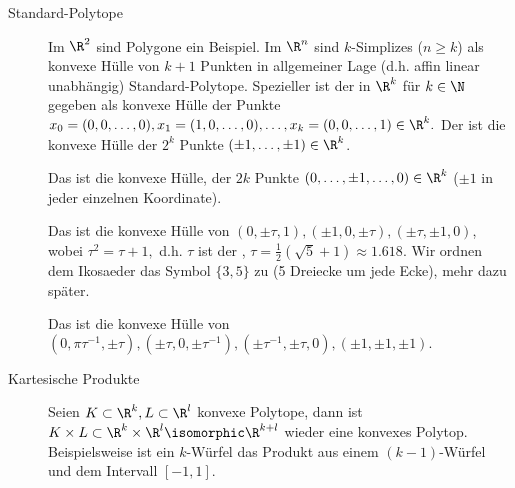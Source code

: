 \begin{ex}
    \begin{description}
        \item[Standard-Polytope]
            Im $\R^2$ sind Polygone ein Beispiel.
            Im $\R^n$ sind $k$-Simplizes ($n \ge k$) als konvexe Hülle von $k + 1$ Punkten in allgemeiner Lage (d.h. affin linear unabhängig) Standard-Polytope.
            Spezieller ist der  in $\R^k$ für $k \in \N$ gegeben als konvexe Hülle der Punkte
            \begin{math}
                x_0 = (0, 0, \dotsc, 0),
                x_1 = (1, 0, \dotsc, 0), \dotsc,
                x_k = (0, 0, \dotsc, 1) \in \R^k.
            \end{math}
            Der  ist die konvexe Hülle der $2^k$ Punkte $(\pm 1, \dotsc, \pm 1) \in \R^k$.

            Das  ist die konvexe Hülle, der $2k$ Punkte $(0, \dotsc, \pm 1, \dotsc, 0) \in \R^k$ ($\pm 1$ in jeder einzelnen Koordinate).

            Das  ist die konvexe Hülle von $(0,\pm \tau, 1), (\pm 1, 0, \pm \tau), (\pm \tau, \pm 1, 0)$, wobei
            \begin{math}
                \tau^2 = \tau + 1,
            \end{math}
            d.h. $\tau$ ist der , $\tau = \frac{1}{2}(\sqrt 5 + 1) \approx 1.618$.
            Wir ordnen dem Ikosaeder das Symbol $\{3,5\}$ zu (5 Dreiecke um jede Ecke), mehr dazu später.

            Das  ist die konvexe Hülle von
            \begin{math}
                (0, \pi \tau^{-1}, \pm \tau),
                (\pm \tau, 0, \pm \tau^{-1}),
                (\pm \tau^{-1}, \pm \tau, 0),
                (\pm 1, \pm 1, \pm 1).
            \end{math}

        \item[Kartesische Produkte]
            Seien $K \subset \R^k, L \subset \R^l$ konvexe Polytope, dann ist
            \begin{math}
                K \times L \subset \R^k \times \R^l \isomorphic \R^{k+l}
            \end{math}
            wieder eine konvexes Polytop.
            Beispielsweise ist ein $k$-Würfel das Produkt aus einem $(k-1)$-Würfel und dem Intervall $[-1,1]$.


\end{description}
\end{ex}
